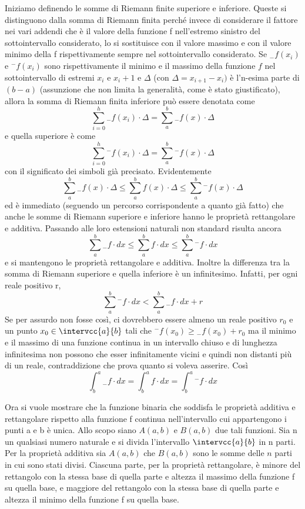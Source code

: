 Iniziamo definendo le somme di Riemann finite superiore e inferiore. Queste 
si distinguono dalla somma di Riemann finita perché invece di considerare il 
fattore nei vari addendi che è il valore della funzione f nell'estremo 
sinistro del sottointervallo considerato, lo si sostituisce con il valore 
massimo e con il valore minimo della f rispettivamente sempre nel 
sottointervallo considerato. Se \({}_{-}f(x_i)\) e \({}^{-}f(x_i)\) sono 
rispettivamente il minimo e il massimo della funzione \(f\) nel 
sottointervallo 
di estremi \(x_i\) e \(x_i+1\) 
e \(\Delta\) (con \(\Delta =x_{i+1} - x_i)\) 
è l'n-esima parte di \((b - a)\) 
(assunzione che non limita la generalità, come è stato giustificato), 
allora la somma di Riemann finita inferiore può essere denotata come 
\[\sum_{i=0}^h{}_{-}f(x_i)\cdot\Delta = \sum_a^b{}_{-} f(x) \cdot \Delta\] 
e quella superiore è come 
\[\sum_{i=0}^h {}^{-}f(x_i)\cdot\Delta = 
  \sum_a^b {}^{-}f(x) \cdot \Delta\] 
con il significato dei simboli già precisato.
Evidentemente 
\[\sum_a^b{}_{-}f(x) \cdot \Delta \le \sum_a^b f(x) \cdot \Delta \le 
\sum_a^b {}^{-}f(x) \cdot \Delta\] 
ed è immediato (seguendo un percorso corrispondente a quanto già fatto) che 
anche le somme di Riemann superiore e inferiore hanno le proprietà rettangolare 
e additiva. 
  Passando alle loro estensioni naturali non standard risulta ancora 
\[\sum_a^b {}_{-}f \cdot dx \le \sum_a^b f \cdot dx \le 
  \sum_a^b {}^{-}f \cdot dx\] 
e si mantengono le proprietà rettangolare e additiva. 
Inoltre la differenza tra la somma di Riemann superiore e quella inferiore è 
un infinitesimo. Infatti, per ogni reale positivo r, 
\[\sum_a^b {}^{-}f \cdot dx < \sum_a^b {}_{-}f \cdot dx +r\] 
Se per assurdo non fosse così, ci dovrebbero essere almeno un reale 
positivo \(r_0\) e un punto \(x_0 \in \intervcc{a}{b}\) tali che 
\({}^{-}f(x_0) \ge {}_{-}f(x_0)+r_0\) 
ma il minimo e il massimo di una funzione continua in un intervallo chiuso e 
di lunghezza infinitesima non possono che esser infinitamente vicini e quindi 
non distanti più di un reale, contraddizione che prova quanto si voleva 
asserire. Così 
\[\int_b^a {}_{-}f \cdot dx = \int_b^a f \cdot dx = 
  \int_b^a {}^{-}f \cdot dx\]
  
Ora si vuole mostrare che la funzione binaria che soddisfa le proprietà 
additiva e rettangolare rispetto alla funzione f continua nell'intervallo 
cui appartengono i punti a e b è unica.
Allo scopo siano \(A(a,b)\) e \(B(a,b)\) due tali funzioni. 
Sia n un qualsiasi numero naturale e si divida l'intervallo 
\(\intervcc{a}{b}\) in n parti. 
Per la proprietà 
additiva sia \(A(a,b)\) che \(B(a,b)\) sono le somme delle \(n\) 
parti in cui sono stati divisi. 
Ciascuna parte, per la proprietà rettangolare, è minore del 
rettangolo con la stessa base di quella parte e altezza il massimo della 
funzione f su quella base, e maggiore del rettangolo con la stessa base di 
quella parte e altezza il minimo della funzione f su quella base. 

